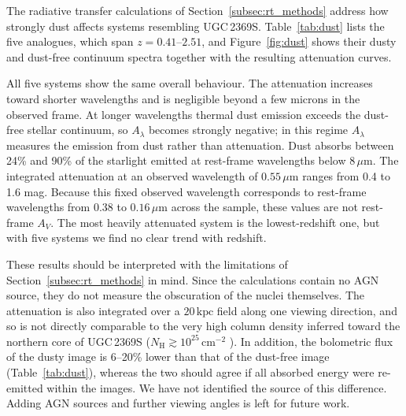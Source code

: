 \documentclass[twocolumn, 10pt]{article}
\begin{document}
The radiative transfer calculations of Section~\ref{subsec:rt_methods} address how strongly dust affects systems resembling UGC\,2369S. Table~\ref{tab:dust} lists the five analogues, which span $z = 0.41$--$2.51$, and Figure~\ref{fig:dust} shows their dusty and dust-free continuum spectra together with the resulting attenuation curves.

All five systems show the same overall behaviour. The attenuation increases toward shorter wavelengths and is negligible beyond a few microns in the observed frame. At longer wavelengths thermal dust emission exceeds the dust-free stellar continuum, so $A_\lambda$ becomes strongly negative; in this regime $A_\lambda$ measures the emission from dust rather than attenuation. Dust absorbs between 24\% and 90\% of the starlight emitted at rest-frame wavelengths below $8\,\mu\mathrm{m}$. The integrated attenuation at an observed wavelength of $0.55\,\mu\mathrm{m}$ ranges from 0.4 to 1.6 mag. Because this fixed observed wavelength corresponds to rest-frame wavelengths from 0.38 to $0.16\,\mu\mathrm{m}$ across the sample, these values are not rest-frame $A_V$. The most heavily attenuated system is the lowest-redshift one, but with five systems we find no clear trend with redshift.

These results should be interpreted with the limitations of Section~\ref{subsec:rt_methods} in mind. Since the calculations contain no AGN source, they do not measure the obscuration of the nuclei themselves. The attenuation is also integrated over a $20\,\mathrm{kpc}$ field along one viewing direction, and so is not directly comparable to the very high column density inferred toward the northern core of UGC\,2369S ($N_\mathrm{H} \gtrsim 10^{25}\,\mathrm{cm^{-2}}$ \citep{Ding2025}). In addition, the bolometric flux of the dusty image is 6--20\% lower than that of the dust-free image (Table~\ref{tab:dust}), whereas the two should agree if all absorbed energy were re-emitted within the images. We have not identified the source of this difference. Adding AGN sources and further viewing angles is left for future work.
\end{document}
